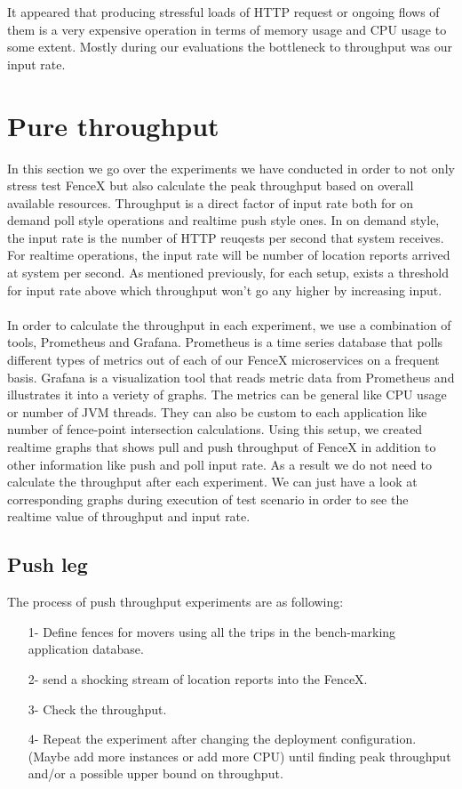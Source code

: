 \documentclass[a4]{report}
\begin{document}
    It appeared that producing stressful loads of HTTP request or ongoing flows of them is a very expensive operation
    in terms of memory usage and CPU usage to some extent.
    Mostly during our evaluations the bottleneck to throughput was our input rate.

    \section{Pure throughput}
    In this section we go over the experiments we have conducted in order to not only stress test FenceX but also
    calculate the peak throughput based on overall available resources.
    Throughput is a direct factor of input rate both for on demand poll style operations and realtime push style ones.
    In on demand style, the input rate is the number of HTTP reuqests per second that system receives.
    For realtime operations, the input rate will be number of location reports arrived at system per second.
    As mentioned previously, for each setup, exists a threshold for input rate above which throughput won't go any
    higher by increasing input.

    \paragraph{}
    In order to calculate the throughput in each experiment, we use a combination of tools, Prometheus and Grafana.
    Prometheus is a time series database that polls different types of metrics out of each of our FenceX
    microservices on a frequent basis.
    Grafana is a  visualization tool that reads metric data from Prometheus and illustrates it into a veriety of graphs.
    The metrics can be general like CPU usage or number of JVM threads.
    They can also be custom to each application like number of fence-point intersection calculations.
    Using this setup, we created realtime graphs that shows pull and push throughput of FenceX in addition to other
    information like push and poll input rate.
    As a result we do not need to calculate the throughput after each experiment.
    We can just have a look at corresponding graphs during execution of test scenario in order to see the realtime
    value of throughput and input rate.


    \subsection{Push leg}
    The process of push throughput experiments are as following:
    \begin{itemize}
        \item[1-] Define fences for movers using all the trips in the bench-marking application database.
        \item[2-] send a shocking stream of location reports into the FenceX.
        \item[3-] Check the throughput.
        \item[4-] Repeat the experiment after changing the deployment configuration. (Maybe add more instances or add
        more CPU) until finding peak throughput and/or a possible upper bound on throughput.
    \end{itemize}
\end{document}
